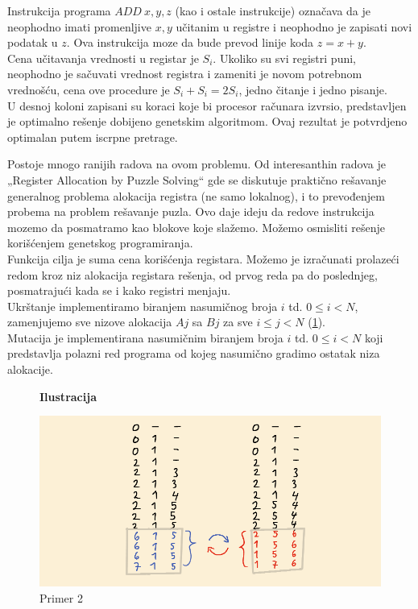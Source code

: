\documentclass[a4paper, 12pt]{article}
\begin{document}
Instrukcija programa $ADD\ x, y, z$ (kao i ostale instrukcije) označava da je neophodno imati promenljive $x, y$ učitanim u registre i neophodno je zapisati novi podatak u $z$. Ova instrukcija moze da bude prevod linije koda $z=x+y$.\\
Cena učitavanja vrednosti u registar je $S_i$. Ukoliko su svi registri puni, neophodno je sačuvati vrednost registra i zameniti je novom potrebnom vrednošću, cena ove procedure je $S_i+S_i=2S_i$, jedno čitanje i jedno pisanje.\\
U desnoj koloni zapisani su koraci koje bi procesor računara izvrsio, predstavljen je optimalno rešenje dobijeno genetskim algoritmom. Ovaj rezultat je potvrdjeno optimalan putem iscrpne pretrage.

Postoje mnogo ranijih radova na ovom problemu. Od interesanthin radova je „Register Allocation by Puzzle Solving“ gde se diskutuje praktično rešavanje generalnog problema alokacija registra (ne samo lokalnog), i to prevođenjem probema na problem rešavanje puzla\cite{RegisterAllocationByPuzzleSolving}. Ovo daje ideju da redove instrukcija mozemo da posmatramo kao blokove koje slažemo. Možemo osmisliti rešenje korišćenjem genetskog programiranja.\\
Funkcija cilja je suma cena korišćenja registara. Možemo je izračunati prolazeći redom kroz niz alokacija registara rešenja, od prvog reda pa do poslednjeg, posmatrajući kada se i kako registri menjaju.\\
Ukrštanje implementiramo biranjem nasumičnog broja $i$ td. $0 \leq i < N$, zamenjujemo sve nizove alokacija $Aj$ sa $Bj$ za sve $i \leq j < N$ (\ref{primer2}).\\
Mutacija je implementirana nasumičnim biranjem broja $i$ td. $0 \leq i < N$ koji predstavlja polazni red programa od kojeg nasumično gradimo ostatak niza alokacije.\\


\begin{figure}
\centering
\textbf{Ilustracija}\par\medskip
\includegraphics[scale=0.45]{Image/Illustration2}
\caption{Primer 2}
\label{primer2}
\end{figure}
\end{document}
